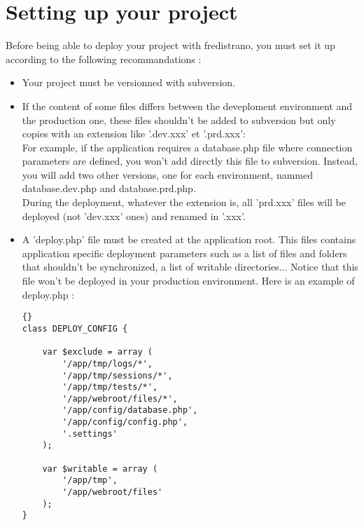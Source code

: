 \documentclass[12pt,a4paper]{report}
\begin{document}
\section{Setting up your project}\label{precimportantes}
Before being able to deploy your project with fredistrano, you must set it up according to the following recommandations :\\
\begin{itemize}
\item Your project must be versionned with subversion.\\
\item If the content of some files differs between the deveploment environment and the production one, these files shouldn't be added to subversion but only copies with an extension like '.dev.xxx' et '.prd.xxx':\\
For example, if the application requires a database.php file where connection parameters are defined, you won't add directly this file to subversion. Instead, you will add two other versions, one for each environment, nammed database.dev.php and database.prd.php.\\ 
During the deployment, whatever the extension is, all 'prd.xxx' files will be deployed (not 'dev.xxx' ones) and renamed in '.xxx'.
\item A 'deploy.php' file must be created at the application root. This files contains application specific deployment parameters such as a list of files and folders that shouldn't be synchronized, a list of writable directories... Notice that this file won't be deployed in your production environment. Here is an example of deploy.php :\\

\lstset{language=Php}
\lstset{commentstyle=\textit}
\begin{lstlisting}[frame=tb]{}
class DEPLOY_CONFIG {

	var $exclude = array (
		'/app/tmp/logs/*',
		'/app/tmp/sessions/*',
		'/app/tmp/tests/*',
		'/app/webroot/files/*',
		'/app/config/database.php',
		'/app/config/config.php',
		'.settings'
	);

	var $writable = array (
		'/app/tmp',
		'/app/webroot/files'
	);
}
\end{lstlisting}

\end{itemize}
\newpage
\end{document}
